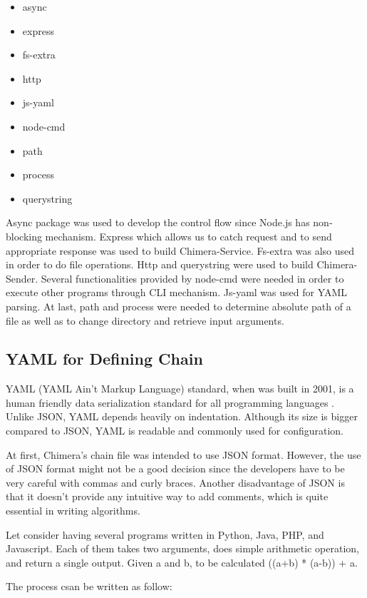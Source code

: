 \documentclass[conference]{IEEEtran}
\begin{document}
\begin{itemize}
    \item async
    \item express
    \item fs-extra
    \item http
    \item js-yaml
    \item node-cmd
    \item path
    \item process
    \item querystring
\end{itemize}

Async package was used to develop the control flow since Node.js has non-blocking
mechanism. Express which allows us to catch request
and to send appropriate response was used to build Chimera-Service. Fs-extra was also used in order to do file operations.
Http and querystring were used to build Chimera-Sender. Several functionalities
provided by node-cmd were needed in order to execute other programs through CLI mechanism.
Js-yaml was used for YAML parsing. At last, path and process were needed to determine 
absolute path of a file as well as to change directory and retrieve input arguments.

\subsection{YAML for Defining Chain}

YAML (YAML Ain't Markup Language) standard, when was built in 2001, is a human friendly data serialization standard for 
all programming languages \cite{yaml}. Unlike JSON,
YAML depends heavily on indentation. Although its size is bigger compared to JSON, YAML
is readable and commonly used for configuration.

At first, Chimera's chain file was intended to use JSON format. However, the use of JSON format might not be a good decision since the developers have to be very 
careful with commas and curly braces. Another disadvantage
of JSON is that it doesn't provide any intuitive way to add comments, which is quite
essential in writing algorithms.

Let consider having several programs written in Python, Java, PHP, and Javascript. 
Each of them takes two arguments, does simple arithmetic operation, and return a single output. 
Given a and b, to be calculated ((a+b) * (a-b)) + a.

The process csan be written as follow:
\end{document}
